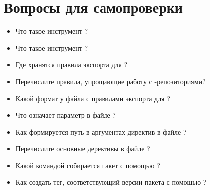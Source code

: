 \section{Вопросы для самопроверки}

\begin{itemize}
	\item Что такое инструмент ?
	\item Что такое инструмент ?
	\item Где хранятся правила экспорта для ?
	\item Перечислите правила, упрощающие работу с -репозиториями?
	\item Какой формат у файла с правилами экспорта для ?
	\item Что означает параметр  в файле ?
	\item Как формируется путь в аргументах директив в файле ?
	\item Перечислите основные дерективы в файле ?
	\item Какой командой собирается пакет с помощью ?
	\item Как создать тег, соответствующий версии пакета с помощью ?
\end{itemize}
